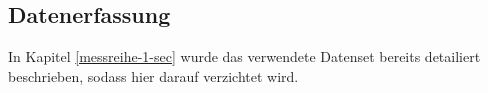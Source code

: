 \subsection{Datenerfassung} \label{datenerfassung-1}


In Kapitel \ref{messreihe-1-sec} wurde das verwendete Datenset bereits detailiert beschrieben, sodass hier darauf verzichtet wird. \\